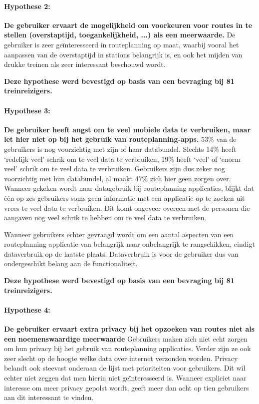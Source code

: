 \paragraph{Hypothese 2:}\textbf{De gebruiker ervaart de mogelijkheid om voorkeuren voor routes in te stellen (overstaptijd, toegankelijkheid, ...) als een meerwaarde.}
	De gebruiker is zeer geïnteresseerd in routeplanning op maat, waarbij vooral het aanpassen van de overstaptijd in stations belangrijk is, en ook het mijden van drukke treinen als zeer interessant beschouwd wordt.

\textbf{Deze hypothese werd bevestigd op basis van een bevraging bij 81 treinreizigers.}

\paragraph{Hypothese 3:}\textbf{ De gebruiker heeft angst om te veel mobiele data te verbruiken, maar let hier niet op bij het gebruik van routeplanning-apps.}
    53\% van de gebruikers is nog voorzichtig met zijn of haar databundel. Slechts 14\% heeft `redelijk veel' schrik om te veel data te verbruiken, 19\% heeft `veel' of `enorm veel' schrik om te veel data te verbruiken. Gebruikers zijn dus zeker nog voorzichtig met hun databundel, al maakt 47\% zich hier geen zorgen over.
    Wanneer gekeken wordt naar datagebruik bij routeplanning applicaties, blijkt dat één op zes gebruikers soms geen informatie met een applicatie op te zoeken uit vrees te veel data te verbruiken. Dit komt ongeveer overeen met de personen die aangaven nog veel schrik te hebben om te veel data te verbruiken.
    
    Wanneer gebruikers echter gevraagd wordt om een aantal aspecten van een routeplanning applicatie van belangrijk naar onbelangrijk te rangschikken, eindigt dataverbruik op de laatste plaats. Dataverbruik is voor de gebruiker dus van ondergeschikt belang aan de functionaliteit.
    
\textbf{Deze hypothese werd bevestigd op basis van een bevraging bij 81 treinreizigers.}

\paragraph{Hypothese 4:}\textbf{De gebruiker ervaart extra privacy bij het opzoeken van routes niet als een noemenswaardige meerwaarde}
	Gebruikers maken zich niet echt zorgen om hun privacy bij het gebruik van routeplanning applicaties. Verder zijn ze ook zeer slecht op de hoogte welke data over internet verzonden worden. Privacy belandt ook steevast onderaan de lijst met prioriteiten voor gebruikers. Dit wil echter niet zeggen dat men hierin niet geïnteresseerd is. Wanneer expliciet naar interesse om meer privacy gepolst wordt, geeft meer dan acht op tien gebruikers aan dit interessant te vinden.
	
